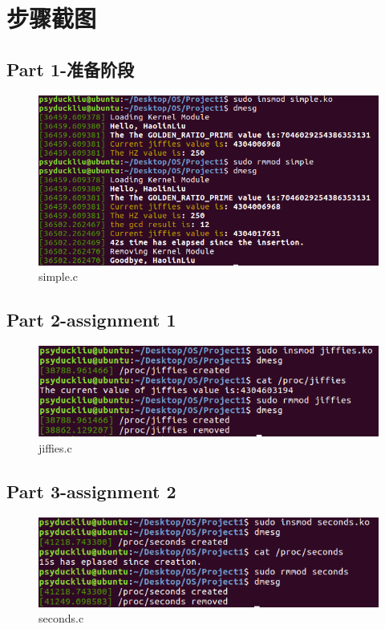 \documentclass[11pt,a4paper]{article}
\begin{document}
	\section{步骤截图}
	\subsection{Part 1-准备阶段}
	\begin{figure}[h]
		\centering
		\includegraphics[width=0.7\linewidth]{pic1}
		\caption[simple.c]{simple.c}
		\label{fig:pic1}
	\end{figure}
	\subsection{Part 2-assignment 1}
	\begin{figure}[h]
		\centering
		\includegraphics[width=0.7\linewidth]{pic2}
		\caption[jiffies.c]{jiffies.c}
		\label{fig:pic2}
	\end{figure}
	\subsection{Part 3-assignment 2}
	\begin{figure}[h]
		\centering
		\includegraphics[width=0.7\linewidth]{pic3}
		\caption[seconds.c]{seconds.c}
		\label{fig:pic3}
	\end{figure}
	
	
	
	
	
	
	
	
	
\end{document}
